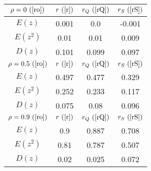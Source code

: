 \begin{tabular}{|c|c|c|c|}
\hline
$\rho = 0~(\ref{ro})$ & $r ~(\ref{r})$ & $r_Q ~(\ref{rQ})$ & $r_S ~(\ref{rS})$\\
\hline
$E(z)$ & 0.001 & 0.0 & -0.001\\
\hline
$E(z^2)$ & 0.01 & 0.01 & 0.009\\
\hline
$D(z)$ & 0.101 & 0.099 & 0.097\\
\hline
$\rho = 0.5~(\ref{ro})$ & $r ~(\ref{r})$ & $r_Q ~(\ref{rQ})$ & $r_S ~(\ref{rS})$\\
\hline
$E(z)$ & 0.497 & 0.477 & 0.329\\
\hline
$E(z^2)$ & 0.252 & 0.233 & 0.117\\
\hline
$D(z)$ & 0.075 & 0.08 & 0.096\\
\hline
$\rho = 0.9~(\ref{ro})$ & $r ~(\ref{r})$ & $r_Q ~(\ref{rQ})$ & $r_S ~(\ref{rS})$\\
\hline
$E(z)$ & 0.9 & 0.887 & 0.708\\
\hline
$E(z^2)$ & 0.81 & 0.787 & 0.507\\
\hline
$D(z)$ & 0.02 & 0.025 & 0.072\\
\hline
\end{tabular}